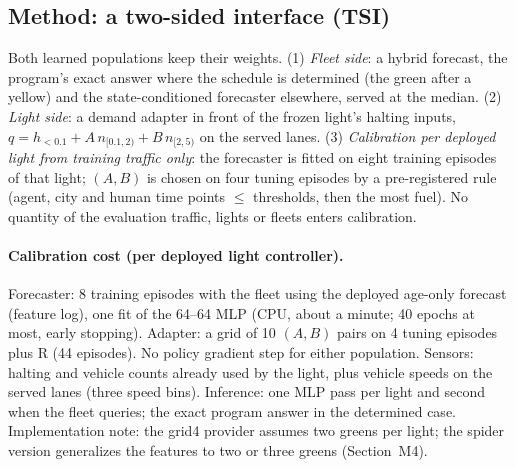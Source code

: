 \documentclass[11pt]{article}
\begin{document}
\subsection{Method: a two-sided interface (TSI)}
Both learned populations keep their weights. (1) \emph{Fleet side}: a hybrid forecast, the program's exact answer where the schedule is
determined (the green after a yellow) and the state-conditioned forecaster elsewhere, served at the median. (2) \emph{Light side}: a demand
adapter in front of the frozen light's halting inputs, $q = h_{<0.1} + A\,n_{[0.1,2)} + B\,n_{[2,5)}$ on the served lanes. (3)
\emph{Calibration per deployed light from training traffic only}: the forecaster is fitted on eight training episodes of that light; $(A,B)$
is chosen on four tuning episodes by a pre-registered rule (agent, city and human time points $\le$ thresholds, then the most fuel). No
quantity of the evaluation traffic, lights or fleets enters calibration.

\paragraph{Calibration cost (per deployed light controller).} Forecaster: 8 training episodes with the fleet using the deployed age-only
forecast (feature log), one fit of the 64--64 MLP (CPU, about a minute; 40 epochs at most, early stopping). Adapter: a grid of 10 $(A,B)$
pairs on 4 tuning episodes plus R (44 episodes). No policy gradient step for either population. Sensors: halting and vehicle counts already
used by the light, plus vehicle speeds on the served lanes (three speed bins). Inference: one MLP pass per light and second when the fleet
queries; the exact program answer in the determined case. Implementation note: the grid4 provider assumes two greens per light; the spider
version generalizes the features to two or three greens (Section~M4).
\end{document}
